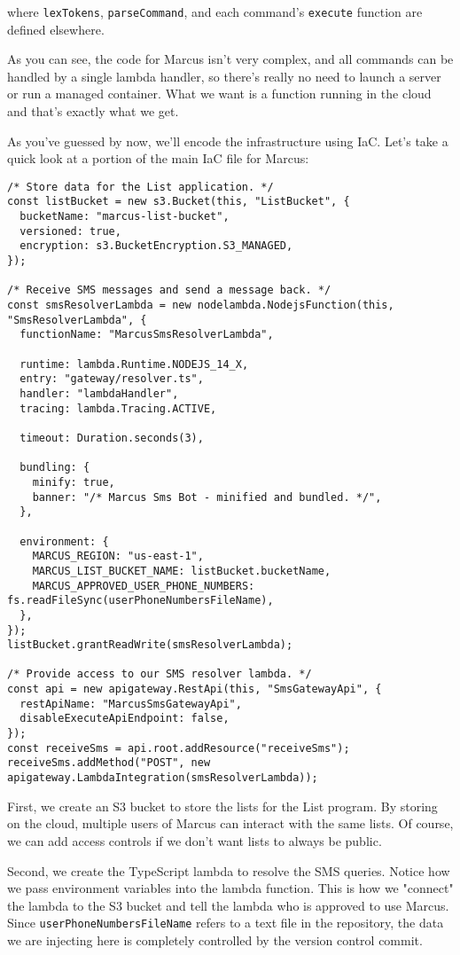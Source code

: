 \documentclass{article}
\begin{document}
where \texttt{lexTokens}, \texttt{parseCommand}, and each command's \texttt{execute} function are defined elsewhere.

As you can see, the code for Marcus isn't very complex, and all commands can be handled by a single lambda handler, so there's really no need to launch a server or run a managed container.
What we want is a function running in the cloud and that's exactly what we get.

As you've guessed by now, we'll encode the infrastructure using IaC.
Let's take a quick look at a portion of the main IaC file for Marcus:

\begin{verbatim}
/* Store data for the List application. */
const listBucket = new s3.Bucket(this, "ListBucket", {
  bucketName: "marcus-list-bucket",
  versioned: true,
  encryption: s3.BucketEncryption.S3_MANAGED,
});

/* Receive SMS messages and send a message back. */
const smsResolverLambda = new nodelambda.NodejsFunction(this, "SmsResolverLambda", {
  functionName: "MarcusSmsResolverLambda",

  runtime: lambda.Runtime.NODEJS_14_X,
  entry: "gateway/resolver.ts",
  handler: "lambdaHandler",
  tracing: lambda.Tracing.ACTIVE,

  timeout: Duration.seconds(3),

  bundling: {
    minify: true,
    banner: "/* Marcus Sms Bot - minified and bundled. */",
  },

  environment: {
    MARCUS_REGION: "us-east-1",
    MARCUS_LIST_BUCKET_NAME: listBucket.bucketName,
    MARCUS_APPROVED_USER_PHONE_NUMBERS: fs.readFileSync(userPhoneNumbersFileName),
  },
});
listBucket.grantReadWrite(smsResolverLambda);

/* Provide access to our SMS resolver lambda. */
const api = new apigateway.RestApi(this, "SmsGatewayApi", {
  restApiName: "MarcusSmsGatewayApi",
  disableExecuteApiEndpoint: false,
});
const receiveSms = api.root.addResource("receiveSms");
receiveSms.addMethod("POST", new apigateway.LambdaIntegration(smsResolverLambda));
\end{verbatim}

First, we create an S3 bucket to store the lists for the List program.
By storing on the cloud, multiple users of Marcus can interact with the same lists.
Of course, we can add access controls if we don't want lists to always be public.

Second, we create the TypeScript lambda to resolve the SMS queries.
Notice how we pass environment variables into the lambda function.
This is how we "connect" the lambda to the S3 bucket and tell the lambda who is approved to use Marcus.
Since \texttt{userPhoneNumbersFileName} refers to a text file in the repository, the data we are injecting here is completely controlled by the version control commit.
\end{document}
